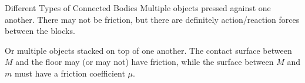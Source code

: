 \documentclass[12pt,compress,aspectratio=169]{beamer}
\begin{document}



\begin{frame}{Different Types of Connected Bodies}
  Multiple objects pressed against one another. There may not be friction, but
  there are definitely action/reaction forces between the blocks.
  \begin{center}
  \end{center}
  Or multiple objects stacked on top of one another. The contact surface between
  $M$ and the floor may (or may not) have friction, while the surface between
  $M$ and $m$ must have a friction coefficient $\mu$.
  \begin{center}
  \end{center}
\end{frame}
\end{document}
